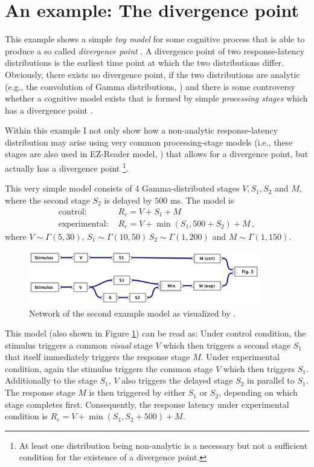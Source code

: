 \section{An example: The divergence point}
This example shows a simple \emph{toy model} for some cognitive process that is able to produce a
so called \emph{divergence point} \cite[e.g.,][]{Reingold2012}. A divergence point of two response-latency
distributions is the earliest time point at which the two distributions differ. Obviously, 
there exists no divergence point, if the two distributions are analytic 
(e.g., the convolution of Gamma distributions, \cite{Mathai1982}) and there is some controversy
whether a cognitive model exists that is formed by simple \emph{processing stages} which has a
divergence point \cite[e.g.,][]{Gomez2016}.

Within this example I not only show how a non-analytic response-latency distribution may arise
using very common processing-stage models (i.e., these stages are also used in EZ-Reader model,
\cite{Reichle2003}) that allows for a divergence point, but actually has a divergence point%
\footnote{At least one distribution being non-analytic is a necessary but not a sufficient
condition for the existence of a divergence point.}. 

This very simple model consists of 4 Gamma-distributed stages $V, S_1, S_2$ and $M$,
where the second stage $S_2$ is delayed by $500$ ms. 
The model is
\begin{align}
 \text{control: } & R_c = V + S_1 + M \\
 \text{experimental: } & R_e = V + \min(S_1, 500+S_2) + M\,,
\end{align}
where $V \sim \Gamma(5,30),\,S_1\sim\Gamma(10,50)\,S_2\sim\Gamma(1,200)$ and $M\sim\Gamma(1,150)$.
\begin{figure}[!ht]
 \centering
 \includegraphics[width=0.9\textwidth]{fig/example2.pdf}
 \caption{Network of the second example model as visualized by .} \label{fig:example2}
\end{figure}

This model (also shown in Figure \ref{fig:example2}) can be read as: Under control condition, the
stimulus triggers a common \emph{visual} stage $V$ which then triggers a second stage $S_1$ that
itself immediately triggers the response stage $M$. Under experimental condition, again the
stimulus triggers the common stage $V$ which then triggers $S_1$. Additionally to the stage $S_1$,
$V$ also triggers the delayed stage $S_2$ in parallel to $S_1$. The response stage $M$ is then triggered by 
either $S_1$ or $S_2$, depending on which stage completes first. Consequently, the response latency
under experimental condition is $R_e = V + \min(S_1,S_2+500) + M$.

